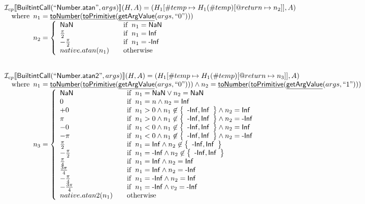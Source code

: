 \documentclass{article}
\newcommand{\SF}[1]{\mbox{\textsf{#1}}}
\newcommand{\wherec}[1]{{\rm where}\begin{array}[t]{l}#1\end{array}}
\newcommand{\ifc}[1]{{\rm if}\begin{array}[t]{l}#1\end{array}}
\newcommand{\owc}{{\rm otherwise}}
\newcommand{\I}{\mathcal{I}}
\newcommand{\set}[1]{\left\{\begin{array}{l}#1\end{array}\right\}}
\newcommand{\lbr}{\llbracket}
\newcommand{\rbr}{\rrbracket}
\newcommand{\hf}[1]{\underline{\sf #1}}
\begin{document}
\[\begin{array}{l}
\I _{cp}\lbr \SF{BuiltintCall}(``\SF{Number.atan}",args)\rbr(H,A)
  = (H_1[\#temp \mapsto H_1(\#temp)[@return \mapsto n_2]], A)\\
\quad\wherec{
  n_1 = \hf{toNumber}(\hf{toPrimitive}(\hf{getArgValue}(args, ``0")))\\
  n_2 = \left\{
    \begin{array}{l@{\quad\quad}l}
      \SF{NaN} & \ifc{n_1=\SF{NaN}}\\
      \frac{\pi}{2} & \ifc{n_1=\SF{Inf}}\\
      -\frac{\pi}{2} & \ifc{n_1=\SF{-Inf}}\\
      native.atan(n_1) & \owc
    \end{array}
  \right.
  }\\
\\\\


\I _{cp}\lbr \SF{BuiltintCall}(``\SF{Number.atan2}",args)\rbr(H,A)
  = (H_1[\#temp \mapsto H_1(\#temp)[@return \mapsto n_3]], A)\\
\quad\wherec{
  n_1 = \hf{toNumber}(\hf{toPrimitive}(\hf{getArgValue}(args, ``0")))
  \land n_2 = \hf{toNumber}(\hf{toPrimitive}(\hf{getArgValue}(args, ``1")))\\
  n_3 = \left\{
    \begin{array}{l@{\quad\quad}l}
      \SF{NaN} & \ifc{n_1=\SF{NaN} \lor n_2=\SF{NaN}}\\
      0 & \ifc{n_1= n \land n_2=\SF{Inf}}\\
      +0 & \ifc{n_1 > 0 \land n_1 \not\in  \set{\SF{-Inf}, \SF{Inf}} \land n_2=\SF{Inf}}\\
      \pi & \ifc{n_1 > 0 \land n_1 \not\in  \set{\SF{-Inf}, \SF{Inf}} \land n_2=\SF{-Inf}}\\
      -0 & \ifc{n_1 < 0 \land n_1 \not\in \set{\SF{-Inf}, \SF{Inf}} \land n_2=\SF{Inf}}\\
      -\pi & \ifc{n_1 < 0 \land n_1 \not\in \set{\SF{-Inf}, \SF{Inf}} \land n_2=\SF{-Inf}}\\
      \frac{\pi}{2} & \ifc{n_1=\SF{Inf} \land n_2 \not\in \set{\SF{-Inf}, \SF{Inf}}}\\
      -\frac{\pi}{2} & \ifc{n_1=\SF{-Inf} \land n_2 \not\in \set{\SF{-Inf}, \SF{Inf}}}\\
      \frac{\pi}{4} & \ifc{n_1=\SF{Inf} \land n_2=\SF{Inf}}\\
      \frac{3\pi}{4} & \ifc{n_1=\SF{Inf} \land n_2=\SF{-Inf}}\\
      -\frac{\pi}{4} & \ifc{n_1=\SF{-Inf} \land n_2=\SF{Inf}}\\
      -\frac{3\pi}{4} & \ifc{n_1=\SF{-Inf} \land v_2=\SF{-Inf}}\\
      native.atan2(n_1) & \owc
    \end{array}
  \right.
  }\\
\\\\


\end{array}\]
\end{document}
